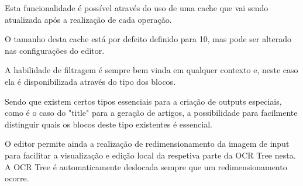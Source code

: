 Esta funcionalidade é possível através do uso de uma cache que vai sendo atualizada após a realização de cada operação.

O tamanho desta cache está por defeito definido para 10, mas pode ser alterado nas configurações do editor.





A habilidade de filtragem é sempre bem vinda em qualquer contexto e, neste caso ela é disponibilizada através do tipo dos blocos.

Sendo que existem certos tipos essenciais para a criação de outputs especiais, como é o caso do "title" para a geração de artigos, a possibilidade para facilmente distinguir quais os blocos deste tipo existentes é essencial. 





O editor permite ainda a realização de redimensionamento da imagem de input para facilitar a visualização e edição local da respetiva parte da OCR Tree nesta. A OCR Tree é automaticamente deslocada sempre que um redimensionamento ocorre.










